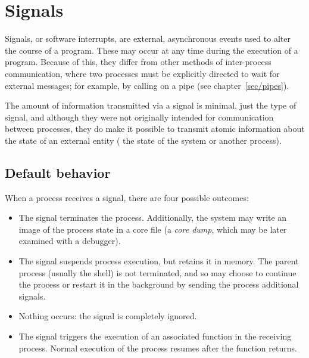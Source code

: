 %
%

\chapter{\label{sec/signals}Signals}

Signals, or software interrupts, are external, asynchronous events
used to alter the course of a program.  These may occur at any
time during the execution of a program.  Because of this,
they differ from other methods of inter-process communication, where
two processes must be explicitly directed to wait for external messages;
for example, by calling  on a pipe (see 
chapter~\ref{sec/pipes}).

The amount of information transmitted via a signal is minimal, just
the type of signal, and although they were not originally
intended for communication between processes, they do make it
possible to transmit atomic information about the state of an
external entity (\eg{} the state of the system or another process). 

\section{Default behavior}

When a process receives a signal, there are four possible outcomes:
%
\begin{itemize}
\item 
The signal terminates the process.  Additionally, the system may write
an image of the process state in a core file (a \emph{core dump}, which
may be later examined with a debugger).
%
\item 
The signal suspends process execution, but retains it in memory.  The
parent process (usually the shell) is not terminated, and so may
choose to continue the process or restart it in the background by
sending the process additional signals.
%
\item Nothing occurs: the signal is completely ignored.
%
\item The signal triggers the execution of an associated function in the
receiving process.  Normal execution of the process resumes after the
function returns.
\end{itemize}
%

